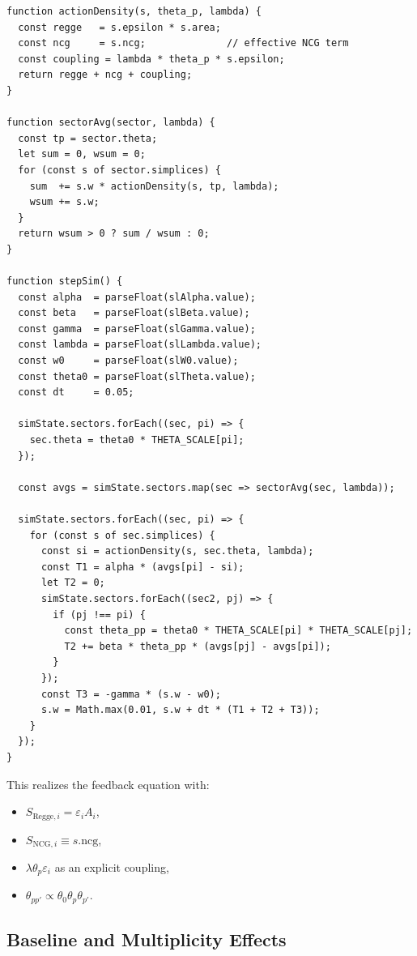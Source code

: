 \documentclass[11pt]{article}
\begin{document}
\begin{verbatim}
function actionDensity(s, theta_p, lambda) {
  const regge   = s.epsilon * s.area;
  const ncg     = s.ncg;              // effective NCG term
  const coupling = lambda * theta_p * s.epsilon;
  return regge + ncg + coupling;
}

function sectorAvg(sector, lambda) {
  const tp = sector.theta;
  let sum = 0, wsum = 0;
  for (const s of sector.simplices) {
    sum  += s.w * actionDensity(s, tp, lambda);
    wsum += s.w;
  }
  return wsum > 0 ? sum / wsum : 0;
}

function stepSim() {
  const alpha  = parseFloat(slAlpha.value);
  const beta   = parseFloat(slBeta.value);
  const gamma  = parseFloat(slGamma.value);
  const lambda = parseFloat(slLambda.value);
  const w0     = parseFloat(slW0.value);
  const theta0 = parseFloat(slTheta.value);
  const dt     = 0.05;

  simState.sectors.forEach((sec, pi) => {
    sec.theta = theta0 * THETA_SCALE[pi];
  });

  const avgs = simState.sectors.map(sec => sectorAvg(sec, lambda));

  simState.sectors.forEach((sec, pi) => {
    for (const s of sec.simplices) {
      const si = actionDensity(s, sec.theta, lambda);
      const T1 = alpha * (avgs[pi] - si);
      let T2 = 0;
      simState.sectors.forEach((sec2, pj) => {
        if (pj !== pi) {
          const theta_pp = theta0 * THETA_SCALE[pi] * THETA_SCALE[pj];
          T2 += beta * theta_pp * (avgs[pj] - avgs[pi]);
        }
      });
      const T3 = -gamma * (s.w - w0);
      s.w = Math.max(0.01, s.w + dt * (T1 + T2 + T3));
    }
  });
}
\end{verbatim}

This realizes the feedback equation with:
\begin{itemize}
  \item \(S_{\mathrm{Regge},i} = \varepsilon_i A_i\),
  \item \(S_{\mathrm{NCG},i} \equiv s.\mathrm{ncg}\),
  \item \(\lambda \theta_p \varepsilon_i\) as an explicit coupling,
  \item \(\theta_{pp'} \propto \theta_0 \theta_p \theta_{p'}\).
\end{itemize}

\subsection{Baseline and Multiplicity Effects}
\end{document}
